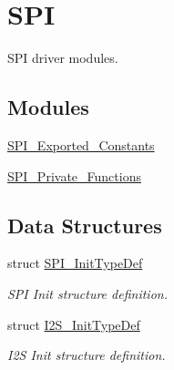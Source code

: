 \hypertarget{group___s_p_i}{\section{S\-P\-I}
\label{group___s_p_i}
}


S\-P\-I driver modules.  


\subsection*{Modules}
\begin{DoxyCompactItemize}
\item 
\hyperlink{group___s_p_i___exported___constants}{S\-P\-I\-\_\-\-Exported\-\_\-\-Constants}
\item 
\hyperlink{group___s_p_i___private___functions}{S\-P\-I\-\_\-\-Private\-\_\-\-Functions}
\end{DoxyCompactItemize}
\subsection*{Data Structures}
\begin{DoxyCompactItemize}
\item 
struct \hyperlink{struct_s_p_i___init_type_def}{S\-P\-I\-\_\-\-Init\-Type\-Def}
\begin{DoxyCompactList}\small\item\em S\-P\-I Init structure definition. \end{DoxyCompactList}\item 
struct \hyperlink{struct_i2_s___init_type_def}{I2\-S\-\_\-\-Init\-Type\-Def}
\begin{DoxyCompactList}\small\item\em I2\-S Init structure definition. \end{DoxyCompactList}\end{DoxyCompactItemize}
